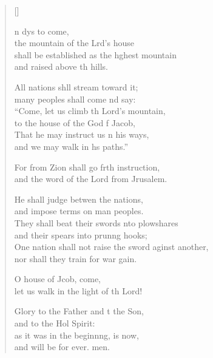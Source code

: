 \settowidth{\versewidth}{One nation shall not raise the sword against another, *}
\begin{verse}[\versewidth]
  \begin{patverse}
n dys to come,\Med\\
the mountain of the Lrd’s house\\
shall be established as the h\pointup{\i}ghest mountain\Med\\
and raised above th hills.

All nations shll stream toward it;\Med\\
many peoples shall come nd say:\\
“Come, let us climb th Lord’s mountain,\Med\\
to the house of the God f Jacob,\\
That he may instruct us \pointup{\i}n his ways, \Med\\
and we may walk in h\pointup{\i}s paths.”

For from Zion shall go frth instruction,\Med\\
and the word of the Lord from Jrusalem.

He shall judge betwen the nations,\Med\\
and impose terms on man peoples.\\
They shall beat their swords \pointup{\i}nto plowshares\Med\\
and their spears into prun\pointup{\i}ng hooks;\\
One nation shall not raise the sword aginst another,\Med\\
nor shall they train for war gain.

O house of Jcob, come,\Med\\
let us walk in the light of th Lord!

Glory to the Father and t the Son,\Med\\
    and to the Hol Spirit:\\
as it was in the beginn\pointup{\i}ng, is now,\Med\\
    and will be for ever. men.
  \end{patverse}
\end{verse}

